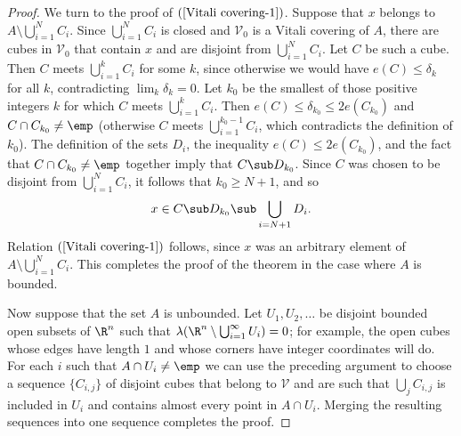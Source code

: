 \begin{proof}
We turn to the proof of $(\ref{Vitali covering-1})$. Suppose that $x$ belongs to $A\setminus\bigcup_{i=1}^{N}C_i$. Since $\bigcup_{i=1}^{N}C_i$ is closed and $\mathcal{V}_0$ is a Vitali covering of $A$, there are cubes in $\mathcal{V}_0$ that contain $x$ and are disjoint from $\bigcup_{i=1}^{N}C_i$. Let $C$ be such a cube. Then $C$ meets $\bigcup_{i=1}^{k}C_i$ for some $k$, since otherwise we would have $e(C)\leq\delta_k$ for all $k$, contradicting $\lim_k\delta_k=0$. Let $k_0$ be the smallest of those positive integers $k$ for which $C$ meets $\bigcup_{i=1}^{k}C_i$. Then $e(C)\leq\delta_{k_0}\leq 2e(C_{k_0})$ and $C\cap C_{k_0}\neq\emp$ (otherwise $C$ meets $\bigcup_{i=1}^{k_0-1}C_i$, which contradicts the definition of $k_0$). The definition of the sets $D_i$, the inequality $e(C)\leq 2e(C_{k_0})$, and the fact that $C\cap C_{k_0}\neq\emp$ together imply that $C\sub D_{k_0}$. Since $C$ was chosen to be disjoint from $\bigcup_{i=1}^{N}C_i$, it follows that $k_0\geq N+1$, and so
\[x\in C\sub D_{k_0}\sub\bigcup_{i=N+1}D_i.\]
Relation $(\ref{Vitali covering-1})$ follows, since $x$ was an arbitrary element of $A\setminus\bigcup_{i=1}^{N}C_i$. This completes the proof of the theorem in the case where $A$ is bounded.\par
Now suppose that the set $A$ is unbounded. Let $U_1,U_2,\dots$ be disjoint bounded open subsets of $\R^n$ such that $\lambda(\R^n\setminus\bigcup_{i=1}^{\infty}U_i)=0$; for example, the open cubes whose edges have length $1$ and whose corners have integer coordinates will do. For each $i$ such that $A\cap U_i\neq\emp$ we can use the preceding argument to choose a sequence $\{C_{i,j}\}$ of disjoint cubes that belong to $\mathcal{V}$ and are such that $\bigcup_jC_{i,j}$ is included in $U_i$ and contains almost every point in $A\cap U_i$. Merging the resulting sequences into one sequence completes the proof.
\end{proof}

